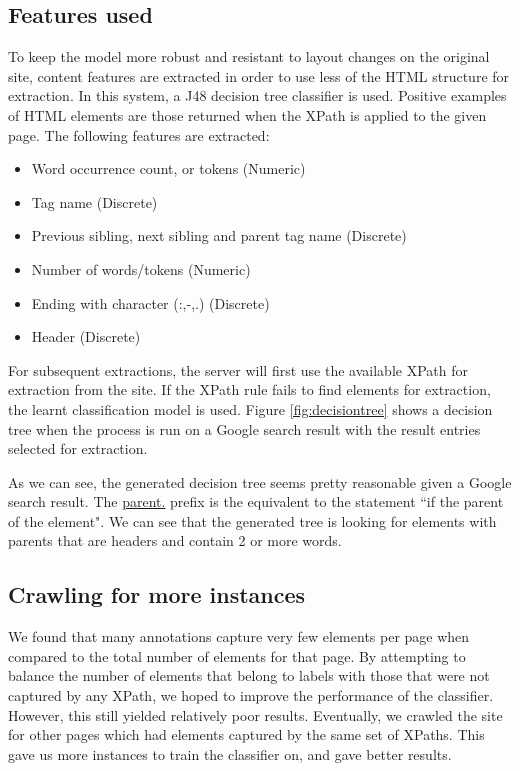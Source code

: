 \subsection{Features used}
To keep the model more robust and resistant to layout changes on the original site, content features are extracted in order to use less of the HTML structure for extraction. In this system, a J48 decision tree classifier is used. Positive examples of HTML elements are those returned when the XPath is applied to the given page. The following features are extracted:

	\begin{itemize}
		\item Word occurrence count, or tokens (Numeric)
		\item Tag name (Discrete)
		\item Previous sibling, next sibling and parent tag name (Discrete)
		\item Number of words/tokens (Numeric)
		\item Ending with character (:,-,.) (Discrete)
		\item Header (Discrete)
	\end{itemize}
	

	
	
	For subsequent extractions, the server will first use the available XPath for extraction from the site.
	If the XPath rule fails to find elements for extraction, the learnt classification model is used. Figure
	\ref{fig:decisiontree} shows a decision tree when the process is run on a Google search result with the
	result entries selected for extraction.


	
	As we can see, the generated decision tree seems pretty reasonable given a Google search result. The
	\url{parent.}	prefix is the equivalent to the statement ``if the parent of the element". We can see
	that the generated tree is looking for elements with parents that are headers and contain 2 or more words.
	
\subsection{Crawling for more instances}
	We found that many annotations capture very few elements per page when compared to the total number of elements for that page. By attempting to balance the number of elements that belong to labels with those that were not captured by any XPath, we hoped to improve the performance of the classifier. However, this still yielded relatively poor results. Eventually, we crawled the site for other pages which had elements captured by the same set of XPaths. This gave us more instances to train the classifier on, and gave better results.
	

